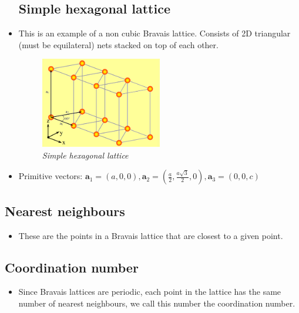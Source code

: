 \documentclass[11pt]{article}
\numberwithin{equation}{section}
\begin{document}
\begin{itemize}
\subsection{Simple hexagonal lattice} 
\item This is an example of a non cubic Bravais lattice.  Consists of 2D triangular (must be equilateral) nets stacked on top of each other. 
\begin{figure}[H]
\centering
\includegraphics[width=0.5\textwidth]{Graph6.png}
\caption{\label{fig:2}\emph{Simple hexagonal lattice}}
\end{figure}
\item Primitive vectors: $\textbf{a}_1 = (a,0,0),\textbf{a}_2 = (\frac{a}{2},\frac{a\sqrt{3}}{2},0), \textbf{a}_3 = (0,0,c)$
 
\end{itemize}

\subsection{Nearest neighbours }
\begin{itemize}
    \item These are the points in a Bravais lattice that are closest to a given point.
\end{itemize}

\subsection{Coordination number}
\begin{itemize}
    \item Since Bravais lattices are periodic, each point in the lattice has the same number of nearest neighbours, we call this number the coordination number. 


\end{itemize}
\end{document}
